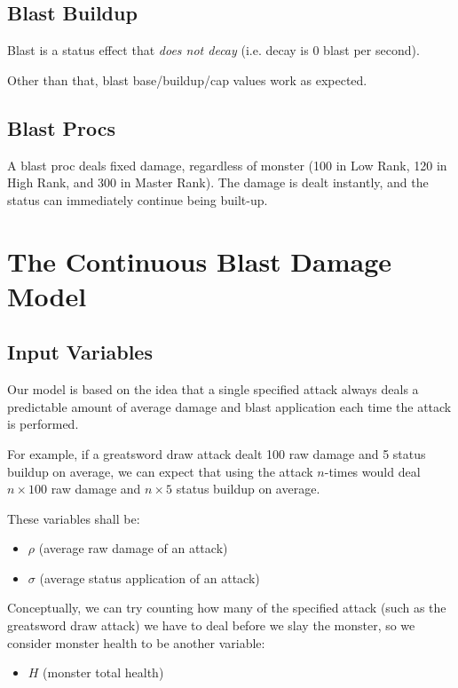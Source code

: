 \documentclass{article}
\begin{document}
\subsection{Blast Buildup}%
\label{sub:blast_buildup}

Blast is a status effect that \textit{does not decay} (i.e. decay is 0 blast per second).

Other than that, blast base/buildup/cap values work as expected.

\subsection{Blast Procs}%
\label{sub:blast_procs}

A blast proc deals fixed damage, regardless of monster (100 in Low Rank, 120 in High Rank, and 300 in Master Rank). The damage is dealt instantly, and the status can immediately continue being built-up.


\section{The Continuous Blast Damage Model}%
\label{sec:the_continuous_blast_damage_model}


\subsection{Input Variables}%
\label{sub:input_variables}

Our model is based on the idea that a single specified attack always deals a predictable amount of average damage and blast application each time the attack is performed.

For example, if a greatsword draw attack dealt 100 raw damage and 5 status buildup on average, we can expect that using the attack $n$-times would deal $n \times 100$ raw damage and $n \times 5$ status buildup on average.

These variables shall be:
\begin{itemize}
    \item $\rho$ (average raw damage of an attack)
    \item $\sigma$ (average status application of an attack)
\end{itemize}

Conceptually, we can try counting how many of the specified attack (such as the greatsword draw attack) we have to deal before we slay the monster, so we consider monster health to be another variable:
\begin{itemize}
    \item $H$ (monster total health)
\end{itemize}
\end{document}
